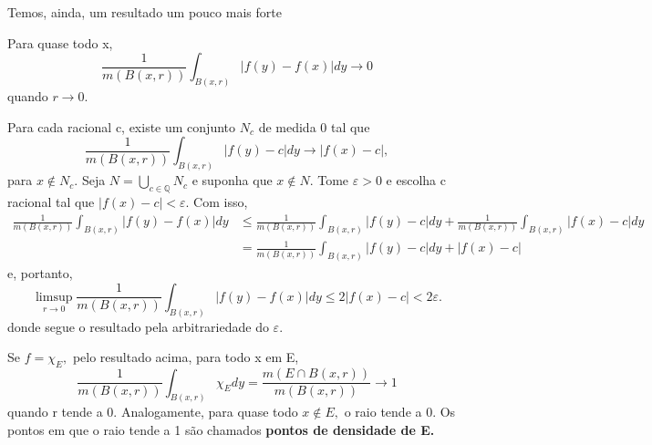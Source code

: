 \documentclass[measure_theory.tex]{subfiles}
\begin{document}
Temos, ainda, um resultado um pouco mais forte
\begin{theorem*}
	Para quase todo x,
	\[
		\frac{1}{m(B(x, r))}\int_{B(x, r)}^{}|f(y) - f(x)|dy\to 0
	\]
	quando \(r\to 0\).
\end{theorem*}
\begin{proof*}
	Para cada racional c, existe um conjunto \(N_{c}\) de medida 0 tal que
	\[
		\frac{1}{m(B(x, r))}\int_{B(x, r)}^{}|f(y)-c|dy\to |f(x)-c|,
	\]
	para \(x\not\in N_{c}.\) Seja \(N = \bigcup_{c\in \mathbb{Q}}^{}N_{c}\) e suponha que \(x\not\in N\). Tome \(\varepsilon > 0\) e escolha c racional tal que \(|f(x) - c| < \varepsilon .\)
	Com isso,
	\begin{align*}
		\frac{1}{m(B(x, r))}\int_{B(x, r)}^{}|f(y) - f(x)|dy & \leq \frac{1}{m(B(x, r))}\int_{B(x, r)}^{}|f(y)-c|dy + \frac{1}{m(B(x, r))}\int_{B(x, r)}^{}|f(x)-c|dy \\
		                                                     & = \frac{1}{m(B(x, r))}\int_{B(x, r)}^{}|f(y)-c|dy + |f(x) - c|
	\end{align*}
	e, portanto,
	\[
		\limsup_{r\to 0}\frac{1}{m(B(x, r))}\int_{B(x, r)}^{}|f(y) - f(x)|dy \leq 2|f(x)-c|< 2\varepsilon.
	\]
	donde segue o resultado pela arbitrariedade do \(\varepsilon \). \qedsymbol
\end{proof*}
Se \(f = \chi_{E},\) pelo resultado acima, para todo x em E,
\[
	\frac{1}{m(B(x, r))}\int_{B(x, r)}^{}\chi_{E}dy = \frac{m(E\cap B(x, r))}{m(B(x, r))}\to 1
\]
quando r tende a 0. Analogamente, para quase todo \(x\not\in E,\) o raio tende a 0. Os pontos em que o raio tende a 1 são chamados \textbf{pontos de densidade de E.}
\end{document}
